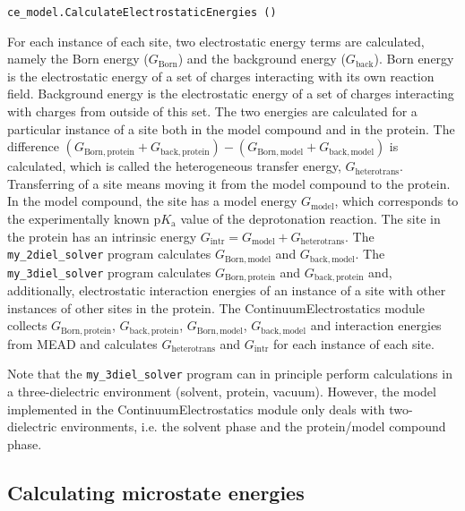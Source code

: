 \documentclass[a4paper,11pt]{article}
\newcommand{\modulename}{ContinuumElectrostatics\xspace}
\newcommand{\pka}{$\mathrm{p}K_{\mathrm{a}}$\xspace}
\begin{document}
{{\footnotesize \begin{lstlisting}
ce_model.CalculateElectrostaticEnergies ()
\end{lstlisting} }

For each instance of each site, two electrostatic energy terms are calculated, namely
the Born energy ($G_{\mathrm{Born}}$) and the background energy ($G_{\mathrm{back}}$).
%
Born energy is the electrostatic energy of a set of charges interacting with its own
reaction field.
%
Background energy is the electrostatic energy of a set of charges interacting with
charges from outside of this set.
%
The two energies are calculated for a particular instance of a site both in the model compound
and in the protein.
%
The difference
$(G_{\mathrm{Born, protein}} + G_{\mathrm{back, protein}}) - (G_{\mathrm{Born, model}} + G_{\mathrm{back, model}})$
is calculated, which is called the heterogeneous transfer energy, $G_{\mathrm{heterotrans}}$.
%
Transferring of a site means moving it from the model compound to the protein.
%
In the model compound, the site has a model energy $G_{\mathrm{model}}$, which
corresponds to the experimentally known \pka value of the deprotonation reaction.
%
The site in the protein has an intrinsic energy $G_{\mathrm{intr}} = G_{\mathrm{model}} + G_{\mathrm{heterotrans}}$.
%
The \texttt{my\_2diel\_solver} program calculates $G_{\mathrm{Born, model}}$ and $G_{\mathrm{back, model}}$.
%
The \texttt{my\_3diel\_solver} program calculates $G_{\mathrm{Born, protein}}$ and $G_{\mathrm{back, protein}}$
and, additionally, electrostatic interaction energies of an instance of a site
with other instances of other sites in the protein.
%
The \modulename module collects 
$G_{\mathrm{Born, protein}}$, $G_{\mathrm{back, protein}}$, 
$G_{\mathrm{Born, model}}$, $G_{\mathrm{back, model}}$ and interaction energies from MEAD 
and calculates $G_{\mathrm{heterotrans}}$ and $G_{\mathrm{intr}}$ for each instance of each site.

Note that the \texttt{my\_3diel\_solver} program can in principle perform calculations
in a three-dielectric environment (solvent, protein, vacuum).
%
However, the model implemented in the \modulename module only deals with two-dielectric environments, 
i.e. the solvent phase and the protein/model compound phase.


\subsection{Calculating microstate energies}

}
\end{document}

